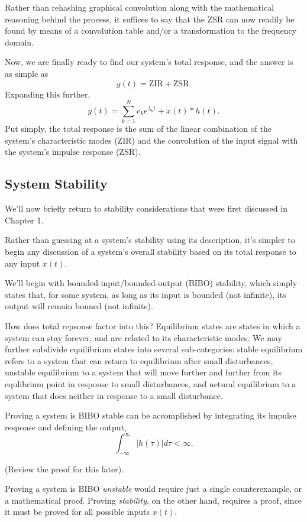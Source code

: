 \documentclass{article}
\begin{document}
Rather than rehashing graphical convolution along with the mathematical reasoning behind the process, it suffices to say that the ZSR can now readily be found by means of a convolution table and/or a transformation to the frequency domain.

Now, we are finally ready to find our system's total response, and the answer is as simple as \[
	y(t) = \mathrm{ZIR} + \mathrm{ZSR}.
\]
Expanding this further,
\[
	y(t) = \sum_{k=1}^{N}c_ke^{\lambda_kt} + x(t) * h(t).
\]
Put simply, the total response is the sum of the linear combination of the system's characteristic modes (ZIR) and the convolution of the input signal with the system's impulse response (ZSR).

\subsection{System Stability}

We'll now briefly return to stability considerations that were first discussed in Chapter 1. 

Rather than guessing at a system's stability using its description, it's simpler to begin any discussion of a system's overall stability based on its total response to any input \(x(t)\). 

We'll begin with bounded-input/bounded-output (BIBO) stability, which simply states that, for some system, as long as its input is bounded (not infinite), its output will remain bouned (not infinite).

How does total repsonse factor into this? Equilibrium states are states in which a system can stay forever, and are related to its characteristic modes. We may further subdivide equilibrium states into several sub-categories: stable equilibrium refers to a system that can return to equilibrium after small disturbances, unstable equilibrium to a system that will move further and further from its equlibrium point in response to small disturbances, and netural equilibrium to a system that does neither in response to a small disturbance.

Proving a system is BIBO stable can be accomplished by integrating its impulse response and defining the output, 
\[
  \int_{-\infty}^{\infty}|h(\tau)|d\tau < \infty.
\]

(Review the proof for this later).

Proving a system is BIBO \textit{unstable} would require just a single counterexample, or a mathematical proof. Proving \textit{stability}, on the other hand, requires a proof, since it must be proved for all possible inputs \(x(t)\).   
\end{document}
